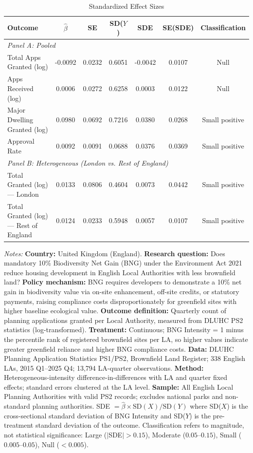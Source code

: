 \begin{table}[htbp]
\centering
\caption{Standardized Effect Sizes}
\label{tab:sde}
\footnotesize
\begin{tabular}{lcccccc}
\hline\hline
Outcome & $\hat{\beta}$ & SE & SD($Y$) & SDE & SE(SDE) & Classification \\
\hline
\multicolumn{7}{l}{\textit{Panel A: Pooled}} \\
Total Apps Granted (log) & -0.0092 & 0.0232 & 0.6051 & -0.0042 & 0.0107 & Null \\
Apps Received (log) & 0.0006 & 0.0272 & 0.6258 & 0.0003 & 0.0122 & Null \\
Major Dwelling Granted (log) & 0.0980 & 0.0692 & 0.7216 & 0.0380 & 0.0268 & Small positive \\
Approval Rate & 0.0092 & 0.0091 & 0.0688 & 0.0376 & 0.0369 & Small positive \\
\hline
\multicolumn{7}{l}{\textit{Panel B: Heterogeneous (London vs. Rest of England)}} \\
Total Granted (log) — London & 0.0133 & 0.0806 & 0.4604 & 0.0073 & 0.0442 & Small positive \\
Total Granted (log) — Rest of England & 0.0124 & 0.0233 & 0.5948 & 0.0057 & 0.0107 & Small positive \\
\hline\hline
\end{tabular}
\begin{tablenotes}[flushleft]\small
\item \textit{Notes:} \textbf{Country:} United Kingdom (England). \textbf{Research question:} Does mandatory 10\% Biodiversity Net Gain (BNG) under the Environment Act 2021 reduce housing development in English Local Authorities with less brownfield land? \textbf{Policy mechanism:} BNG requires developers to demonstrate a 10\% net gain in biodiversity value via on-site enhancement, off-site credits, or statutory payments, raising compliance costs disproportionately for greenfield sites with higher baseline ecological value. \textbf{Outcome definition:} Quarterly count of planning applications granted per Local Authority, measured from DLUHC PS2 statistics (log-transformed). \textbf{Treatment:} Continuous; BNG Intensity = 1 minus the percentile rank of registered brownfield sites per LA, so higher values indicate greater greenfield reliance and higher BNG compliance costs. \textbf{Data:} DLUHC Planning Application Statistics PS1/PS2, Brownfield Land Register; 338 English LAs, 2015 Q1--2025 Q4; 13,794 LA-quarter observations. \textbf{Method:} Heterogeneous-intensity difference-in-differences with LA and quarter fixed effects; standard errors clustered at the LA level. \textbf{Sample:} All English Local Planning Authorities with valid PS2 records; excludes national parks and non-standard planning authorities. SDE $= \hat{\beta} \times \text{SD}(X) / \text{SD}(Y)$ where SD($X$) is the cross-sectional standard deviation of BNG Intensity and SD($Y$) is the pre-treatment standard deviation of the outcome. Classification refers to magnitude, not statistical significance: Large ($|$SDE$| > 0.15$), Moderate ($0.05$--$0.15$), Small ($0.005$--$0.05$), Null ($< 0.005$).
\end{tablenotes}
\end{table}

